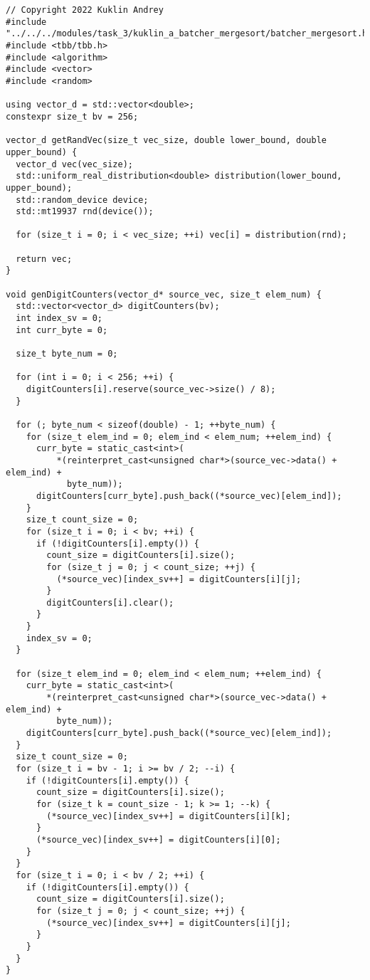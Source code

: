 \documentclass{report}
\begin{document}
\begin{lstlisting}
// Copyright 2022 Kuklin Andrey
#include "../../../modules/task_3/kuklin_a_batcher_mergesort/batcher_mergesort.h"
#include <tbb/tbb.h>
#include <algorithm>
#include <vector>
#include <random>

using vector_d = std::vector<double>;
constexpr size_t bv = 256;

vector_d getRandVec(size_t vec_size, double lower_bound, double upper_bound) {
  vector_d vec(vec_size);
  std::uniform_real_distribution<double> distribution(lower_bound, upper_bound);
  std::random_device device;
  std::mt19937 rnd(device());

  for (size_t i = 0; i < vec_size; ++i) vec[i] = distribution(rnd);

  return vec;
}

void genDigitCounters(vector_d* source_vec, size_t elem_num) {
  std::vector<vector_d> digitCounters(bv);
  int index_sv = 0;
  int curr_byte = 0;

  size_t byte_num = 0;

  for (int i = 0; i < 256; ++i) {
    digitCounters[i].reserve(source_vec->size() / 8);
  }

  for (; byte_num < sizeof(double) - 1; ++byte_num) {
    for (size_t elem_ind = 0; elem_ind < elem_num; ++elem_ind) {
      curr_byte = static_cast<int>(
          *(reinterpret_cast<unsigned char*>(source_vec->data() + elem_ind) +
            byte_num));
      digitCounters[curr_byte].push_back((*source_vec)[elem_ind]);
    }
    size_t count_size = 0;
    for (size_t i = 0; i < bv; ++i) {
      if (!digitCounters[i].empty()) {
        count_size = digitCounters[i].size();
        for (size_t j = 0; j < count_size; ++j) {
          (*source_vec)[index_sv++] = digitCounters[i][j];
        }
        digitCounters[i].clear();
      }
    }
    index_sv = 0;
  }

  for (size_t elem_ind = 0; elem_ind < elem_num; ++elem_ind) {
    curr_byte = static_cast<int>(
        *(reinterpret_cast<unsigned char*>(source_vec->data() + elem_ind) +
          byte_num));
    digitCounters[curr_byte].push_back((*source_vec)[elem_ind]);
  }
  size_t count_size = 0;
  for (size_t i = bv - 1; i >= bv / 2; --i) {
    if (!digitCounters[i].empty()) {
      count_size = digitCounters[i].size();
      for (size_t k = count_size - 1; k >= 1; --k) {
        (*source_vec)[index_sv++] = digitCounters[i][k];
      }
      (*source_vec)[index_sv++] = digitCounters[i][0];
    }
  }
  for (size_t i = 0; i < bv / 2; ++i) {
    if (!digitCounters[i].empty()) {
      count_size = digitCounters[i].size();
      for (size_t j = 0; j < count_size; ++j) {
        (*source_vec)[index_sv++] = digitCounters[i][j];
      }
    }
  }
}


\end{lstlisting}
\end{document}
